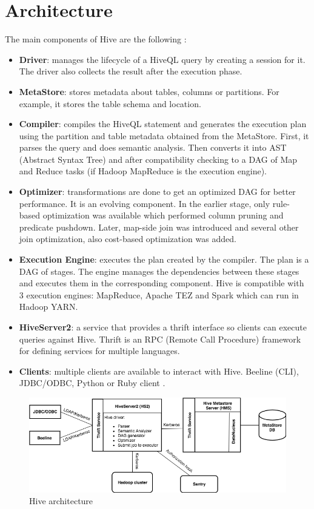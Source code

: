 \section{Architecture}
The main components of Hive are the following \cite{Hive-paper}:
\begin{itemize}
	\item \textbf{Driver}: manages the lifecycle of a HiveQL query by creating a session for it. The driver also collects the result after the execution phase.
	\item  \textbf{MetaStore}: stores metadata about tables, columns or partitions. For example, it stores the table schema and location.
	\item \textbf{Compiler}: compiles the HiveQL statement and generates the execution plan using the partition and table metadata obtained from the MetaStore. First, it parses the query and does semantic analysis. Then converts it into AST (Abstract Syntax Tree) and after compatibility checking to a DAG of Map and Reduce tasks (if Hadoop MapReduce is the execution engine). 
	\item \textbf{Optimizer}: transformations are done to get an optimized DAG for better performance. It is an evolving component. In the earlier stage, only rule-based optimization was available which performed column pruning and predicate pushdown. Later, map-side join was introduced and several other join optimization, also cost-based optimization was added.
	\item \textbf{Execution Engine}: executes the plan created by the compiler. The plan is a DAG of stages. The engine manages the dependencies between these stages and executes them in the corresponding component. Hive is compatible with 3 execution engines: MapReduce, Apache TEZ and Spark which can run in Hadoop YARN.
	\item \textbf{HiveServer2}: a service that provides a thrift interface so clients can execute queries against Hive. Thrift is an RPC (Remote Call Procedure) framework for defining services for multiple languages.
	\item \textbf{Clients}: multiple clients are available to interact with Hive. Beeline (CLI), JDBC/ODBC, Python or Ruby client \etc.
\end{itemize}

\begin{figure}[H]
	\includegraphics[width=150mm, keepaspectratio]{figures/Hive_architecture.png}
	\centering
	\caption{Hive architecture}
\end{figure}

